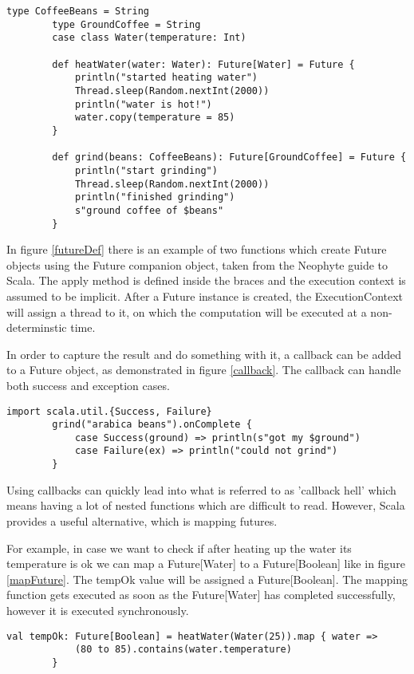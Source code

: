 \documentclass[12pt]{article}
\begin{document}
	\begin{lstlisting}[style=myScalastyle, caption={Methods for creating Future objects}, label={futureDef}]
		type CoffeeBeans = String
		type GroundCoffee = String
		case class Water(temperature: Int)

		def heatWater(water: Water): Future[Water] = Future {
			println("started heating water")
			Thread.sleep(Random.nextInt(2000))
			println("water is hot!")
			water.copy(temperature = 85)
		}

		def grind(beans: CoffeeBeans): Future[GroundCoffee] = Future {
			println("start grinding")
			Thread.sleep(Random.nextInt(2000))
			println("finished grinding")
			s"ground coffee of $beans"
		}
	\end{lstlisting}

	In figure \ref{futureDef} there is an example of two functions which create Future objects using 
	the Future companion object, taken from the Neophyte guide to Scala\cite{FuturePromiseNeophyte}. 
	The apply method is defined inside the braces and the execution context is assumed to be implicit.
	After a Future instance is created, the ExecutionContext will assign a thread to it, on which 
	the computation will be executed at a non-determinstic time.

	In order to capture the result and do something with it, a callback can be added to a Future 
	object, as demonstrated in figure \ref{callback}. The callback can handle both success and 
	exception cases. 
	\begin{lstlisting}[style=myScalastyle, caption={Registering callbacks}, label={callback}]
		import scala.util.{Success, Failure}
		grind("arabica beans").onComplete {
			case Success(ground) => println(s"got my $ground")
			case Failure(ex) => println("could not grind")
		}
	\end{lstlisting}

	Using callbacks can quickly lead into what is referred to as 'callback hell'\cite{FuturePromiseNeophyte}
	which means having a lot of nested functions which are difficult to read. However, Scala provides 
	a useful alternative, which is mapping futures. 

	For example, in case we want to check if after heating up the water its temperature is ok we 
	can map a Future[Water] to a Future[Boolean] like in figure \ref{mapFuture}. The tempOk value 
	will be assigned a Future[Boolean]. The mapping function gets executed as soon as the 
	Future[Water] has completed successfully, however it is executed synchronously.
	\begin{lstlisting}[style=myScalastyle, caption={Mapping future}, label={mapFuture}]
		val tempOk: Future[Boolean] = heatWater(Water(25)).map { water =>
			(80 to 85).contains(water.temperature)
		}
	\end{lstlisting}
\end{document}
